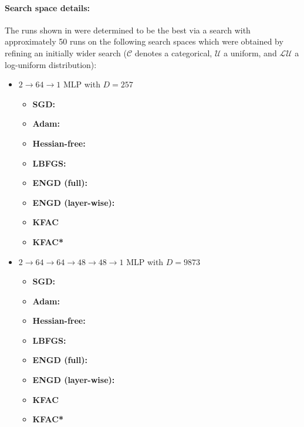 \paragraph{Search space details:} The runs shown in  were determined to be the best via a search with approximately 50 runs on the following search spaces which were obtained by refining an initially wider search ($\mathcal{C}$ denotes a categorical, $\mathcal{U}$ a uniform, and $\mathcal{LU}$ a log-uniform distribution):
\begin{itemize}
\item $2\to 64\to 1$ MLP with $D=257$
  \begin{itemize}
    \def\pathToRuns{../kfac_pinns_exp/exp09_reproduce_poisson2d/tex}
  \item \textbf{SGD:} 
  \item \textbf{Adam:} 
  \item \textbf{Hessian-free:} 
  \item \textbf{LBFGS:} 
  \item \textbf{ENGD (full):} 
  \item \textbf{ENGD (layer-wise):} 
  \item \textbf{KFAC} 
  \item \textbf{KFAC*} 
  \end{itemize}

\item $2 \to 64 \to 64 \to 48 \to 48 \to 1$ MLP with $D=\num{9873}$
  \begin{itemize}
    \def\pathToRuns{../kfac_pinns_exp/exp15_poisson2d_deepwide/tex}
  \item \textbf{SGD:} 
  \item \textbf{Adam:} 
  \item \textbf{Hessian-free:} 
  \item \textbf{LBFGS:} 
  \item \textbf{ENGD (full):} 
  \item \textbf{ENGD (layer-wise):} 
  \item \textbf{KFAC} 
  \item \textbf{KFAC*} 
  \end{itemize}


\end{itemize}
